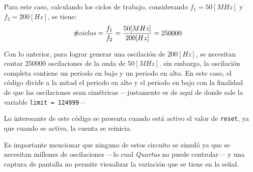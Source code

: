 \documentclass[../procedimientos.tex]{subfiles}
\begin{document}
Para este caso, calculando los ciclos de trabajo, considerando $f_1 = 50 
[MHz]$ y $f_2 = 200 [Hz]$, se tiene:
\[ \# ciclos = \frac{f_1}{f_2}\\ = \frac{50 [MHz]}{200 [Hz]}\\ = 250000 \]

Con lo anterior, para lograr generar una oscilación de $200 [Hz]$, se 
necesitan contar $250000$ oscilaciones de la onda de $50 [MHz]$. sin embargo, 
la oscilación completa contiene un periodo en bajo y un periodo en alto. En 
este caso, el código divide a la mitad el periodo en alto y el periodo en bajo 
con la finalidad de que las oscilaciones sean simétricas ---justamente es de 
aquí de donde sale la variable \texttt{limit = 124999}---

Lo interesante de este código se presenta cuando está activo el valor de 
\texttt{reset}, ya que cuando se activa, la cuenta se reinicia.

Es importante mencionar que ninguno de estos circuito se simuló ya que se 
necesitan millones de oscilaciones ---lo cual \textit{Quartus} no puede 
controlar--- y una captura de pantalla no permite visualizar la variación que 
se tiene en la señal.
\end{document}
